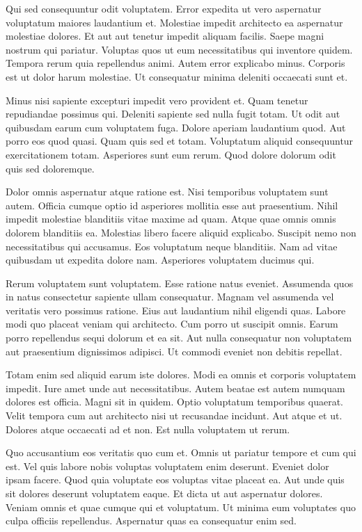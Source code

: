Qui sed consequuntur odit voluptatem. Error expedita ut vero aspernatur voluptatum maiores laudantium et. Molestiae impedit architecto ea aspernatur molestiae dolores. Et aut aut tenetur impedit aliquam facilis. Saepe magni nostrum qui pariatur. Voluptas quos ut eum necessitatibus qui inventore quidem. Tempora rerum quia repellendus animi. Autem error explicabo minus. Corporis est ut dolor harum molestiae. Ut consequatur minima deleniti occaecati sunt et.

Minus nisi sapiente excepturi impedit vero provident et. Quam tenetur repudiandae possimus qui. Deleniti sapiente sed nulla fugit totam. Ut odit aut quibusdam earum cum voluptatem fuga. Dolore aperiam laudantium quod. Aut porro eos quod quasi. Quam quis sed et totam. Voluptatum aliquid consequuntur exercitationem totam. Asperiores sunt eum rerum. Quod dolore dolorum odit quis sed doloremque.

Dolor omnis aspernatur atque ratione est. Nisi temporibus voluptatem sunt autem. Officia cumque optio id asperiores mollitia esse aut praesentium. Nihil impedit molestiae blanditiis vitae maxime ad quam. Atque quae omnis omnis dolorem blanditiis ea. Molestias libero facere aliquid explicabo. Suscipit nemo non necessitatibus qui accusamus. Eos voluptatum neque blanditiis. Nam ad vitae quibusdam ut expedita dolore nam. Asperiores voluptatem ducimus qui.

Rerum voluptatem sunt voluptatem. Esse ratione natus eveniet. Assumenda quos in natus consectetur sapiente ullam consequatur. Magnam vel assumenda vel veritatis vero possimus ratione. Eius aut laudantium nihil eligendi quas. Labore modi quo placeat veniam qui architecto. Cum porro ut suscipit omnis. Earum porro repellendus sequi dolorum et ea sit. Aut nulla consequatur non voluptatem aut praesentium dignissimos adipisci. Ut commodi eveniet non debitis repellat.

Totam enim sed aliquid earum iste dolores. Modi ea omnis et corporis voluptatem impedit. Iure amet unde aut necessitatibus. Autem beatae est autem numquam dolores est officia. Magni sit in quidem. Optio voluptatum temporibus quaerat. Velit tempora cum aut architecto nisi ut recusandae incidunt. Aut atque et ut. Dolores atque occaecati ad et non. Est nulla voluptatem ut rerum.

Quo accusantium eos veritatis quo cum et. Omnis ut pariatur tempore et cum qui est. Vel quis labore nobis voluptas voluptatem enim deserunt. Eveniet dolor ipsam facere. Quod quia voluptate eos voluptas vitae placeat ea. Aut unde quis sit dolores deserunt voluptatem eaque. Et dicta ut aut aspernatur dolores. Veniam omnis et quae cumque qui et voluptatum. Ut minima eum voluptates quo culpa officiis repellendus. Aspernatur quas ea consequatur enim sed.

